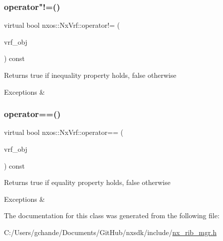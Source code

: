 \subsubsection{\texorpdfstring{operator"!=()}{operator!=()}}
{\footnotesize\ttfamily virtual bool nxos\+::\+Nx\+Vrf\+::operator!= (\begin{DoxyParamCaption}\item[{\mbox{\hyperlink{classnxos_1_1_nx_vrf}{Nx\+Vrf}} const \&}]{vrf\+\_\+obj }\end{DoxyParamCaption}) const\hspace{0.3cm}{\ttfamily [pure virtual]}}

\begin{DoxyReturn}{Returns}
true if inequality property holds, false otherwise
\end{DoxyReturn}

\begin{DoxyCode}
\end{DoxyCode}



\begin{DoxyExceptions}{Exceptions}
{\em } & \\
\hline
\end{DoxyExceptions}
\mbox{\label{classnxos_1_1_nx_vrf_adc5d2e97b5fceb4fab75c448fb54ada5}} 
\subsubsection{\texorpdfstring{operator==()}{operator==()}}
{\footnotesize\ttfamily virtual bool nxos\+::\+Nx\+Vrf\+::operator== (\begin{DoxyParamCaption}\item[{\mbox{\hyperlink{classnxos_1_1_nx_vrf}{Nx\+Vrf}} const \&}]{vrf\+\_\+obj }\end{DoxyParamCaption}) const\hspace{0.3cm}{\ttfamily [pure virtual]}}

\begin{DoxyReturn}{Returns}
true if equality property holds, false otherwise
\end{DoxyReturn}

\begin{DoxyCode}
\end{DoxyCode}



\begin{DoxyExceptions}{Exceptions}
{\em } & \\
\hline
\end{DoxyExceptions}


The documentation for this class was generated from the following file\+:\begin{DoxyCompactItemize}
\item 
C\+:/\+Users/gchande/\+Documents/\+Git\+Hub/nxsdk/include/\mbox{\hyperlink{nx__rib__mgr_8h}{nx\+\_\+rib\+\_\+mgr.\+h}}\end{DoxyCompactItemize}
